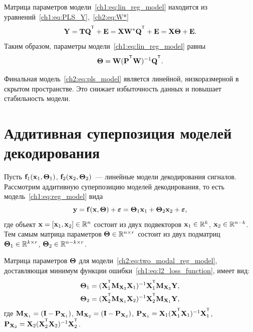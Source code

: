 Матрица параметров модели~\ref{ch1:eq:lin_reg_model} находится из уравнений~\eqref{ch1:eq:PLS_Y},~\eqref{ch2:eq:W*}
\begin{equation}
	\bY = \bT \bQ^{\T} + \bE = \bX \bW^* \bQ^{\T} + \bE = \bX \bTheta + \bE.
	\label{ch2:eq:pls_model}
\end{equation}
Таким образом, параметры модели~\eqref{ch1:eq:lin_reg_model} равны
\begin{equation*}
	\bTheta = \bW (\bP^{\T} \bW)^{-1} \bQ^{\T}.
\end{equation*}

Финальная модель~\eqref{ch2:eq:pls_model} является линейной, низкоразмерной в скрытом пространстве. 
Это снижает избыточность данных и повышает стабильность модели.

\section{Аддитивная суперпозиция моделей декодирования}
\label{sec:ch2:superposition}

Пусть $\mathbf{f}_1(\mathbf{x}_1, \boldsymbol{\Theta}_1)$, $\mathbf{f}_2(\mathbf{x}_2, \boldsymbol{\Theta}_2)$~--- линейные модели декодирования сигналов. 
Рассмотрим аддитивную суперпозицию моделей декодирования, то есть модель~\eqref{ch1:eq:reg_model} вида
\begin{equation}
	\mathbf{y} = \mathbf{f}(\mathbf{x}, \boldsymbol{\Theta}) + \boldsymbol{\varepsilon} = \boldsymbol{\Theta}_1 \mathbf{x}_1 + \boldsymbol{\Theta}_2 \mathbf{x}_2 + \boldsymbol{\varepsilon},
	\label{ch2:eq:two_modal_reg_model}
\end{equation}
где объект $\mathbf{x} = [\mathbf{x}_1, \mathbf{x}_2] \in \mathbb{R}^n$ состоит из двух подвекторов $\mathbf{x}_1 \in \mathbb{R}^k$, $\mathbf{x}_2 \in \mathbb{R}^{n - k}$. Тем самым матрица параметров $\boldsymbol{\Theta} \in \mathbb{R}^{n \times r}$ состоит из двух подматриц $\boldsymbol{\Theta}_1 \in \mathbb{R}^{k \times r}$, $\boldsymbol{\Theta}_2 \in \mathbb{R}^{n - k \times r}$. 

\begin{statement}
	\label{ch2:stat:two_modal_params}
	Матрица параметров $\boldsymbol{\Theta}$ для модели~\eqref{ch2:eq:two_modal_reg_model}, доставляющая минимум функции ошибки~\eqref{ch1:eq:l2_loss_function}, имеет вид:
	\begin{align*}
		\bTheta_1 &= (\bX_1^{\T} \bM_{\bX_2} \bX_1)^{-1} \bX_1^{\T} \bM_{\bX_2} \bY, \\
		\bTheta_2 &= (\bX_2^{\T} \bM_{\bX_1} \bX_2)^{-1} \bX_2^{\T} \bM_{\bX_1} \bY,
	\end{align*}
	где $\mathbf{M}_{\mathbf{X}_1} = (\mathbf{I} - \mathbf{P}_{\mathbf{X}_1})$, $\mathbf{M}_{\mathbf{X}_2} = (\mathbf{I} - \mathbf{P}_{\mathbf{X}_2})$, $\bP_{\bX_1} = \bX_1 (\bX_1^{\T} \bX_1)^{-1} \bX_1^{\T}$, $\bP_{\bX_2} = \bX_2 (\bX_2^{\T} \bX_2)^{-1} \bX_2^{\T}$.
\end{statement}

